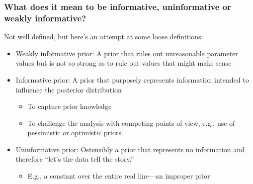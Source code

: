 \documentclass{beamer}
\begin{document}



\begin{frame}
  \frametitle{What does it mean to be informative, uninformative or
    weakly informative?}
  
Not well defined, but here's an attempt at some loose definitions:
  \begin{itemize}
  \item<1-> Weakly informative prior: A prior that rules out unreasonable
    parameter values but is not so strong as to rule out values that
    might make sense
\item<2-> Informative prior: A prior that purposely represents
  information intended to influence the  posterior distribution
  \begin{itemize}
  \item To capture prior knowledge
\item To challenge the analysis with competing points of view, e.g.,
  use of pessimistic or optimistic priors.
  \end{itemize}
\item<3-> Uninformative prior: Ostensibly a prior that represents no
  information and therefore ``let's the data tell the story.''
  \begin{itemize}
  \item E.g., a constant over the entire real line---an improper prior
  \end{itemize}
  \end{itemize}

\end{frame}
\end{document}
